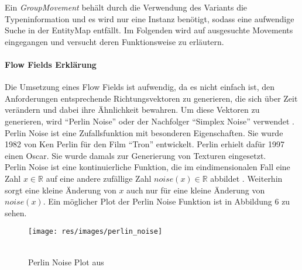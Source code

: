 \documentclass[11pt,a4paper]{article}
\begin{document}
Ein \textit{GroupMovement} behält durch die Verwendung des Variants die Typeninformation und es wird nur eine Instanz benötigt, sodass eine aufwendige Suche in der EntityMap entfällt. Im Folgenden wird auf ausgesuchte Movements eingegangen und versucht deren Funktionsweise zu erläutern.

\paragraph{Flow Fields Erklärung}
Die Umsetzung eines Flow Fields ist aufwendig, da es nicht einfach ist, den Anforderungen entsprechende Richtungsvektoren zu generieren, die sich über Zeit verändern und dabei ihre Ähnlichkeit bewahren. Um diese Vektoren zu generieren, wird ``Perlin Noise'' oder der Nachfolger ``Simplex Noise'' verwendet \cite{bcc7190da8e90284b4e790817b8eed4ee3ea6cffbe5a23ef07a000ca5628ffbc}. Perlin Noise ist eine Zufallsfunktion mit besonderen Eigenschaften. Sie wurde 1982 von Ken Perlin für den Film ``Tron'' entwickelt. Perlin erhielt dafür 1997 einen Oscar. Sie wurde damals zur Generierung von Texturen eingesetzt.\\
Perlin Noise ist eine kontinuierliche Funktion, die im  eindimensionalen Fall eine Zahl $x \in \mathbb{R}$ auf eine andere zufällige Zahl $noise(x) \in \mathbb{R}$ abbildet \cite{25a05da283ffd9d4bdda94c308ccf3a8759f22373b368f895cbef2e9186ab646}. Weiterhin sorgt eine kleine Änderung von $x$ auch nur für eine kleine Änderung von $noise(x)$. Ein möglicher Plot der Perlin Noise Funktion ist in Abbildung 6 zu sehen.
\begin{SCfigure}[][h]
\hspace{110pt}
\texttt{[image: res/images/perlin\_noise]}
\caption[Perlin Noise Plot aus \cite{nature_of_code}]{\\Perlin Noise Plot aus \cite[Kap.\\Introduction]{nature_of_code}}
\end{SCfigure}
\end{document}

